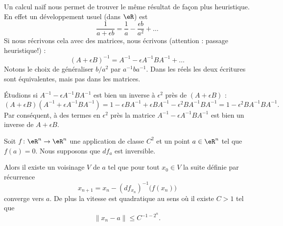 \begin{remark}
    Un calcul naïf nous permet de trouver le même résultat de façon plus heuristique. En effet un développement usuel (dans \( \eR\)) est
    \begin{equation}
        \frac{1}{ a+\epsilon b }=\frac{1}{ a }-\frac{ \epsilon b }{ a^2 }+\ldots
    \end{equation}
    Si nous récrivons cela avec des matrices, nous écrivons (attention : passage heuristique!) :
    \begin{equation}
        (A+\epsilon B)^{-1}=A^{-1}-\epsilon A^{-1} BA^{-1}+\ldots
    \end{equation}
    Notons le choix de généraliser \( b/a^2\) par \( a^{-1} ba^{-1}\). Dans les réels les deux écritures sont équivalentes, mais pas dans les matrices.

    Étudions si \( A^{-1}-\epsilon A^{-1}BA^{-1}\) est bien un inverse à \( \epsilon^2\) près de \( (A+\epsilon B)\) :
    \begin{equation}
        (A+\epsilon B)(A^{-1}+\epsilon A^{-1} BA^{-1})=1-\epsilon BA^{-1}+\epsilon BA^{-1}-\epsilon^2BA^{-1}BA^{-1}=1-\epsilon^2BA^{-1} BA^{-1}.
    \end{equation}
    Par conséquent, à des termes en \( \epsilon^2\) près la matrice \( A^{-1}-\epsilon A^{-1}BA^{-1}\) est bien un inverse de \( A+\epsilon B\).
\end{remark}

\begin{theorem}
    Soit \( f\colon \eR^n\to \eR^n\) une application de classe \( C^2\) et un point \( a\in \eR^n\) tel que \( f(a)=0\). Nous supposons que \( df_a\) est inversible.

    Alors il existe un voisinage \( V\) de \( a\) tel que pour tout \( x_0\in V\) la suite définie par récurrence
    \begin{equation}
        x_{n+1}=x_n-(df_{x_n})^{-1}\big( f(x_n) \big)
    \end{equation}
    converge vers \( a\). De plus la vitesse est quadratique au sens où il existe \( C>1\) tel que 
    \begin{equation}        \label{EqtkiDXt}
        \| x_n-a \|\leq C^{-1-2^n}.
    \end{equation}
\end{theorem}

